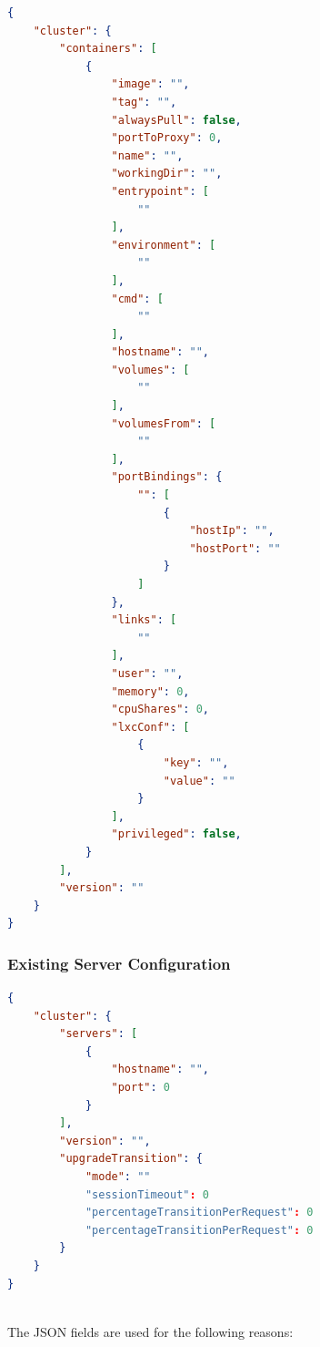 \documentclass[a4paper,11pt,twoside]{report}
\begin{document}
\begin{lstlisting}[language=json]
{
    "cluster": {
        "containers": [
            {
                "image": "", 
                "tag": "", 
                "alwaysPull": false, 
                "portToProxy": 0, 
                "name": "", 
                "workingDir": "", 
                "entrypoint": [
                    ""
                ], 
                "environment": [
                    ""
                ], 
                "cmd": [
                    ""
                ], 
                "hostname": "", 
                "volumes": [
                    ""
                ], 
                "volumesFrom": [
                    ""
                ], 
                "portBindings": {
                    "": [
                        {
                            "hostIp": "", 
                            "hostPort": ""
                        }
                    ]
                }, 
                "links": [
                    ""
                ], 
                "user": "",
                "memory": 0,
                "cpuShares": 0, 
                "lxcConf": [
                    {
                        "key": "", 
                        "value": ""
                    }
                ],
                "privileged": false,
            }
        ], 
        "version": ""
    }
}
\end{lstlisting}

\subsubsection*{Existing Server Configuration}

\begin{lstlisting}[language=json]
{
    "cluster": {
        "servers": [
            {
                "hostname": "", 
                "port": 0
            }
        ], 
        "version": "", 
        "upgradeTransition": {
            "mode": ""
            "sessionTimeout": 0  
            "percentageTransitionPerRequest": 0
            "percentageTransitionPerRequest": 0  
        }
    }
}
\end{lstlisting}

\noindent\\
The JSON fields are used for the following reasons:
\end{document}
